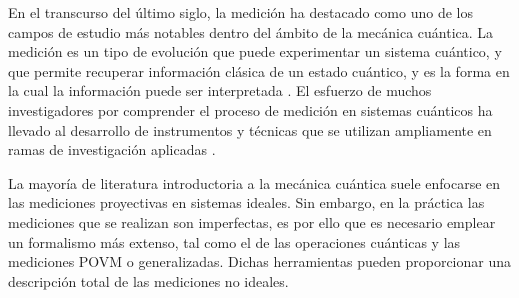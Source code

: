 \documentclass[12pt,oneside]{book}\raggedbottom{} %
\begin{document}
\begin{sloppypar}
{{%







En el transcurso del último siglo, la medición ha destacado como uno de los campos de estudio más notables dentro del ámbito de la mecánica cuántica. La medición es un tipo de evolución que puede experimentar un sistema cuántico, y que permite recuperar información clásica de un estado cuántico, y es la forma en la cual la información puede ser interpretada {\cite{wilde2011classical}}. El esfuerzo de muchos investigadores por comprender el proceso de medición en sistemas cuánticos ha llevado al desarrollo de instrumentos y técnicas que se utilizan ampliamente en ramas de investigación aplicadas {\cite{de2019introduction}}. %




La mayoría de literatura introductoria a la mecánica cuántica suele enfocarse en las mediciones proyectivas en sistemas ideales. %
Sin embargo, en la práctica las mediciones que se realizan son imperfectas, es por ello que es necesario emplear un formalismo más extenso, tal como el de las operaciones cuánticas y las mediciones POVM o generalizadas. Dichas herramientas pueden proporcionar una descripción total de las mediciones no ideales. 

}}
\end{sloppypar}
\end{document}

